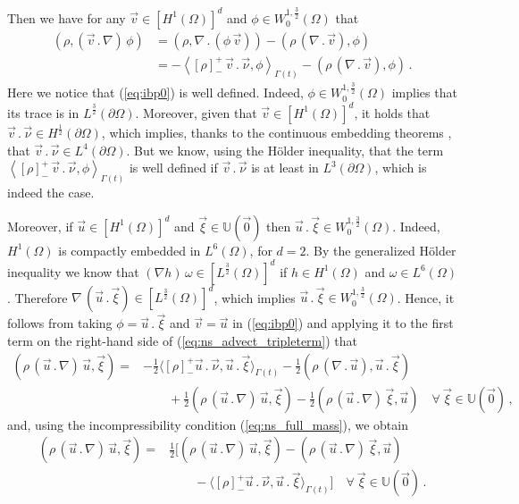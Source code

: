 \documentclass[a4paper,12pt,onecolumn]{article}
\newcommand{\uspace}[1]{\mathbb{U}(\vec{#1})}
\begin{document}
Then we have for any $\vec v \in [H^1(\Omega)]^d$ and
$\phi\in W_0^{1,\frac{3}{2}}(\Omega)$ that
\begin{align}\label{eq:ibp0}
( \rho,(\vec v \,.\,\nabla)\,\phi) & = (\rho, \nabla\,.\,(\phi\,\vec v))
- (\rho\,(\nabla\,.\,\vec v), \phi) \nonumber \\ & =
- \left\langle [\rho]_-^+\,\vec v\,.\,\vec \nu,
  \phi \right\rangle_{\Gamma(t)}
- (\rho\,(\nabla\,.\,\vec v), \phi)\,.
\end{align}
Here we notice that (\ref{eq:ibp0}) is well defined. Indeed, $\phi\in
W_0^{1,\frac{3}{2}}(\Omega)$ implies that its trace is in
$L^{\frac{3}{2}}(\partial\Omega)$. Moreover, given that
$\vec v \in [H^1(\Omega)]^d$, it holds that $\vec v\,.\,\vec\nu \in
H^{\frac{1}{2}}(\partial\Omega)$, which implies, thanks to the continuous
embedding theorems \cite[Theorem~6.5 and 6.7]{DINEZZA2012}, that $\vec
v\,.\,\vec\nu \in L^4(\partial\Omega)$. But we know, using the
H\"{o}lder inequality, that the term $\left\langle [\rho]_-^+\,\vec v\,.\,
\vec \nu, \phi \right\rangle_{\Gamma(t)}$ is well defined if
$\vec v\,.\,\vec\nu$ is at least in $L^3(\partial\Omega)$, which is indeed the
case.

Moreover, if $\vec u\in [H^1(\Omega)]^d$ and $\vec \xi \in \uspace{0}$ then
$\vec u\,.\,\vec\xi \in W_0^{1,\frac{3}{2}}(\Omega)$. Indeed, $H^1(\Omega)$ is
compactly embedded in $L^6(\Omega)$, for $d=2$. By the
generalized H\"{o}lder inequality we know that $(\nabla h)\,\omega\in
[L^{\frac{3}{2}}(\Omega)]^d$ if $h\in H^1(\Omega)$ and $\omega\in L^6(\Omega)$.
Therefore $\nabla\,(\vec u\,.\,\vec \xi)\in [L^{\frac{3}{2}}(\Omega)]^d$,
which implies
$\vec u\,.\,\vec \xi \in W_0^{1,\frac{3}{2}}(\Omega)$. Hence, it follows from
taking $\phi = \vec u\,.\,\vec\xi$ and $\vec v = \vec u$ in (\ref{eq:ibp0}) and
applying it to the first term on the right-hand side of
(\ref{eq:ns_advect_tripleterm}) that
\begin{align}\label{eq:fulladvect}
( \rho\,(\vec u \,.\,\nabla)\,\vec u, \vec \xi) = &
-\tfrac{1}{2}\langle [\rho]_-^+\vec u\,.\,\vec \nu, \vec u\,.\,\vec \xi
\rangle_{\Gamma(t)}
-\tfrac{1}{2}(\rho\,(\nabla\,.\,\vec u ),\vec u\,.\,\vec\xi) \nonumber \\
& \qquad +\tfrac{1}{2}(\rho\,(\vec u\,.\,\nabla)\,\vec u, \vec \xi)
-\tfrac{1}{2}(\rho\,(\vec u\,.\,\nabla)\,\vec \xi,\vec u)
\quad \forall\ \vec \xi \in \uspace 0\,,
\end{align}
and, using the incompressibility condition (\ref{eq:ns_full_mass}), we obtain
\begin{align}\label{eq:advect}
( \rho\,(\vec u \,.\,\nabla)\,\vec u, \vec \xi)
= & \tfrac{1}{2} [ (\rho\,(\vec u\,.\,\nabla)\,\vec u, \vec \xi) -
(\rho\,(\vec u\,.\,\nabla)\,\vec \xi,\vec u) \nonumber \\
& \qquad -\langle [\rho]_-^+\vec u\,.\,\vec \nu, \vec u\,.\,\vec \xi
\rangle_{\Gamma(t)}] \quad \forall\ \vec \xi \in \uspace 0\,.
\end{align}
\end{document}
